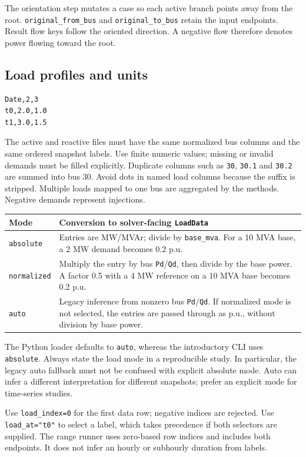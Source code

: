 \documentclass[11pt,a4paper]{article}
\newcommand{\code}[1]{\nolinkurl{#1}}
\begin{document}
The orientation step mutates a case so each active branch points away from
the root. \code{original_from_bus} and \code{original_to_bus} retain the input
endpoints. Result flow keys follow the oriented direction. A negative flow
therefore denotes power flowing toward the root.

\subsection{Load profiles and units}
\label{sec:units}
\begin{lstlisting}
Date,2,3
t0,2.0,1.0
t1,3.0,1.5
\end{lstlisting}
The active and reactive files must have the same normalized bus columns and
the same ordered snapshot labels. Use finite numeric values; missing or
invalid demands must be filled explicitly. Duplicate columns such as
\code{30}, \code{30.1} and \code{30.2} are summed into bus 30. Avoid dots in
named load columns because the suffix is stripped. Multiple loads mapped to
one bus are aggregated by the methods. Negative demands represent injections.

\begin{longtable}{p{.20\linewidth}p{.72\linewidth}}
\toprule Mode & Conversion to solver-facing \code{LoadData} \\\midrule\endhead
\code{absolute} & Entries are MW/MVAr; divide by \code{base_mva}. For a 10 MVA base, a 2 MW demand becomes 0.2 p.u.\\
\code{normalized} & Multiply the entry by bus \code{Pd}/\code{Qd}, then divide by the base power. A factor 0.5 with a 4 MW reference on a 10 MVA base becomes 0.2 p.u.\\
\code{auto} & Legacy inference from nonzero bus \code{Pd}/\code{Qd}. If normalized mode is not selected, the entries are passed through as p.u., without division by base power.\\
\bottomrule
\end{longtable}
The Python loader defaults to \code{auto}, whereas the introductory CLI uses
\code{absolute}. Always state the load mode in a reproducible study. In
particular, the legacy auto fallback must not be confused with explicit
absolute mode. Auto can infer a different interpretation for different
snapshots; prefer an explicit mode for time-series studies.

Use \code{load_index=0} for the first data row; negative indices are rejected.
Use \code{load_at="t0"} to select a label, which takes precedence if both
selectors are supplied. The range runner uses zero-based row indices and
includes both endpoints. It does not infer an hourly or subhourly duration
from labels.
\end{document}

